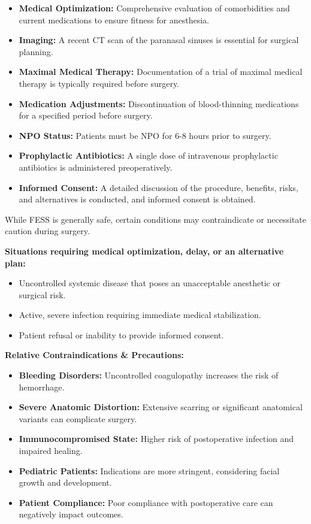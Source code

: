 \begin{itemize}
  \item \textbf{Medical Optimization:} Comprehensive evaluation of comorbidities and current medications to ensure fitness for anesthesia.
  \item \textbf{Imaging:} A recent CT scan of the paranasal sinuses is essential for surgical planning.
  \item \textbf{Maximal Medical Therapy:} Documentation of a trial of maximal medical therapy is typically required before surgery.
  \item \textbf{Medication Adjustments:} Discontinuation of blood-thinning medications for a specified period before surgery.
  \item \textbf{NPO Status:} Patients must be NPO for 6-8 hours prior to surgery.
  \item \textbf{Prophylactic Antibiotics:} A single dose of intravenous prophylactic antibiotics is administered preoperatively.
  \item \textbf{Informed Consent:} A detailed discussion of the procedure, benefits, risks, and alternatives is conducted, and informed consent is obtained.
\end{itemize}

While FESS is generally safe, certain conditions may contraindicate or necessitate caution during surgery.

\textbf{Situations requiring medical optimization, delay, or an alternative plan:}
\begin{itemize}
  \item Uncontrolled systemic disease that poses an unacceptable anesthetic or surgical risk.
  \item Active, severe infection requiring immediate medical stabilization.
  \item Patient refusal or inability to provide informed consent.
\end{itemize}

\textbf{Relative Contraindications \& Precautions:}
\begin{itemize}
  \item \textbf{Bleeding Disorders:} Uncontrolled coagulopathy increases the risk of hemorrhage.
  \item \textbf{Severe Anatomic Distortion:} Extensive scarring or significant anatomical variants can complicate surgery.
  \item \textbf{Immunocompromised State:} Higher risk of postoperative infection and impaired healing.
  \item \textbf{Pediatric Patients:} Indications are more stringent, considering facial growth and development.
  \item \textbf{Patient Compliance:} Poor compliance with postoperative care can negatively impact outcomes.
\end{itemize}

